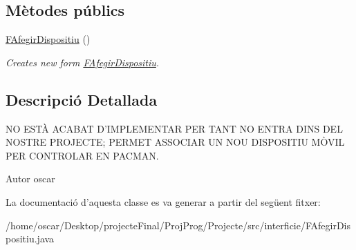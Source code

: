 \subsection*{Mètodes públics}
\begin{DoxyCompactItemize}
\item 
\hypertarget{classinterficie_1_1_f_afegir_dispositiu_a587fa9fb0219ca9bf3db91a8249bd75c}{\hyperlink{classinterficie_1_1_f_afegir_dispositiu_a587fa9fb0219ca9bf3db91a8249bd75c}{F\+Afegir\+Dispositiu} ()}\label{classinterficie_1_1_f_afegir_dispositiu_a587fa9fb0219ca9bf3db91a8249bd75c}

\begin{DoxyCompactList}\small\item\em Creates new form \hyperlink{classinterficie_1_1_f_afegir_dispositiu}{F\+Afegir\+Dispositiu}. \end{DoxyCompactList}\end{DoxyCompactItemize}


\subsection{Descripció Detallada}
N\+O E\+S\+TÀ A\+C\+A\+B\+A\+T D'I\+M\+P\+L\+E\+M\+E\+N\+T\+A\+R P\+E\+R T\+A\+N\+T N\+O E\+N\+T\+R\+A D\+I\+N\+S D\+E\+L N\+O\+S\+T\+R\+E P\+R\+O\+J\+E\+C\+T\+E; P\+E\+R\+M\+E\+T A\+S\+S\+O\+C\+I\+A\+R U\+N N\+O\+U D\+I\+S\+P\+O\+S\+I\+T\+I\+U MÒ\+V\+I\+L P\+E\+R C\+O\+N\+T\+R\+O\+L\+A\+R E\+N P\+A\+C\+M\+A\+N. 

\begin{DoxyAuthor}{Autor}
oscar 
\end{DoxyAuthor}


La documentació d'aquesta classe es va generar a partir del següent fitxer\+:\begin{DoxyCompactItemize}
\item 
/home/oscar/\+Desktop/projecte\+Final/\+Proj\+Prog/\+Projecte/src/interficie/F\+Afegir\+Dispositiu.\+java\end{DoxyCompactItemize}
